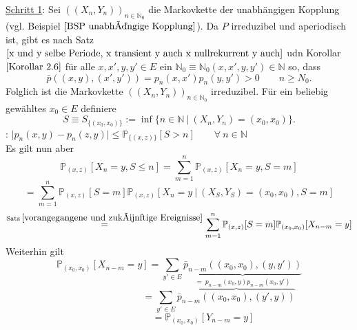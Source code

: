 \underline{Schritt 1}: Sei  $((X_{n},Y_{n}))_{n \in \mathbb{N}_{0}}$ die Markovkette der unabhängigen Kopplung (vgl. Beispiel $\ref{BSP unabhängige Kopplung}$). Da $P$ irreduzibel und aperiodisch ist, gibt es nach Satz $\ref{x und y selbe Periode, x transient y auch x nullrekurrent y auch}$ udn Korollar $\ref{Korollar 2.6}$ für alle $x,x',y,y' \in E$ ein $\mathbb{N}_{0} \equiv \mathbb{N}_{0}(x,x',y,y') \in \mathbb{N}$ so, dass
\begin{equation*}
\bar{p} \left( (x,y),(x',y') \right) = p_{n}(x,x')p_{n}(y,y') > 0 \qquad n \geq N_{0}.
\end{equation*}
Folglich ist die Markovkette  $((X_{n},Y_{n}))_{n \in \mathbb{N}_{0}}$ irreduzibel. Für ein beliebig gewähltes $x_{0} \in E$ definiere
\begin{equation*}
S \equiv S_{\lbrace (x_{0},x_{0}) \rbrace} := \inf \lbrace n \in \mathbb{N} \: | \:  \left( X_{n},Y_{n} \right)  =(x_{0},x_{0}) \rbrace.
\end{equation*}
: $\vert p_{n}(x,y) - p_{n}(z,y) \vert \leq \mathbb{P}_{\lbrace (x,z) \rbrace}[S>n] \qquad \forall \: n \in \mathbb{N}$
\\
Es gilt nun aber 
\begin{equation*}
\mathbb{P}_{(x,z)}[X_{n} = y, S \leq n] = \sum_{m=1}^{n} \mathbb{P}_{(x,z)}[X_{n}=y, S = m]
\end{equation*}
\begin{equation*}
= \sum_{m=1}^{n} \mathbb{P}_{(x,z)}[S = m]\mathbb{P}_{(x,z)}[X_{n}=y  \: | \: (X_{S},Y_{S})=(x_{0},x_{0}), S = m]
\end{equation*}
\begin{equation*}
\stackrel{\mathrm{Satz \:}\ref{vorangegangene und zukünftige Ereignisse}}{=}
\sum_{m=1}^{n} \mathbb{P}_{(x,z)}[S = m]\mathbb{P}_{(x_{0},x_{0})}[X_{n-m}=y]
\end{equation*}
Weiterhin gilt
\begin{equation*}
\mathbb{P}_{(x_{0},x_{0})}[X_{n-m}=y] = \sum_{y' \in E} \underbrace{\bar{p}_{n-m}\left( (x_{0},x_{0}),(y,y') \right)}_{= \: p_{n-m}(x_{0},y)p_{n-m}(x_{0},y')}
\end{equation*}
\begin{equation*}
\qquad \qquad  \qquad \qquad \:   = \sum_{y' \in E} \overbrace{\bar{p}_{n-m}\left( (x_{0},x_{0}),(y',y) \right)}
\end{equation*}
\begin{equation*}
\qquad \qquad  \quad = \mathbb{P}_{(x_{0},x_{0})}[Y_{n-m}=y]
\end{equation*}
